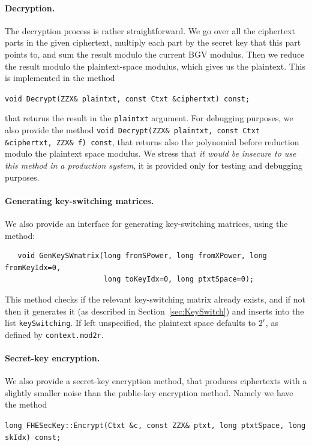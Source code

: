 \documentclass[14pt]{extarticle}
\newcommand{\secref}[1]{Section~\protect\ref{sec:#1}}
\begin{document}
\paragraph{Decryption.} The decryption process is rather
straightforward. We go over all the ciphertext parts in the given
ciphertext, multiply each part by the secret key that this part
points to, and sum the result modulo the current BGV modulus. Then
we reduce the result modulo the plaintext-space modulus, which
gives us the plaintext. This is implemented in the method

\texttt{void Decrypt(ZZX\& plaintxt, const Ctxt \&ciphertxt) const;}

\noindent
that returns the result in the \texttt{plaintxt} argument. For
debugging purposes, we also provide the method \texttt{void
Decrypt(ZZX\& plaintxt, const Ctxt \&ciphertxt, ZZX\& f) const}, that
returns also the polynomial before reduction modulo the plaintext
space modulus. We stress that \emph{it would be insecure to use this
method in a production system}, it is provided only for testing and
debugging purposes.

\paragraph{Generating key-switching matrices.} We also provide an
interface for generating key-switching matrices, using the method:

\begin{verbatim}
   void GenKeySWmatrix(long fromSPower, long fromXPower, long fromKeyIdx=0,
                       long toKeyIdx=0, long ptxtSpace=0);
\end{verbatim}

\noindent
This method checks if the relevant key-switching matrix already
exists, and if not then it generates it (as described in
\secref{KeySwitch}) and inserts into the list \texttt{keySwitching}.
If left unspecified, the plaintext space defaults to $2^r$, as defined
by \texttt{context.mod2r}.

\paragraph{Secret-key encryption.} We also provide a secret-key
encryption method, that produces ciphertexts with a slightly smaller
noise than the public-key encryption method. Namely we have the method
\smallskip

\texttt{long FHESecKey::Encrypt(Ctxt \&c, const ZZX\& ptxt, long ptxtSpace, long skIdx) const;}
\end{document}
